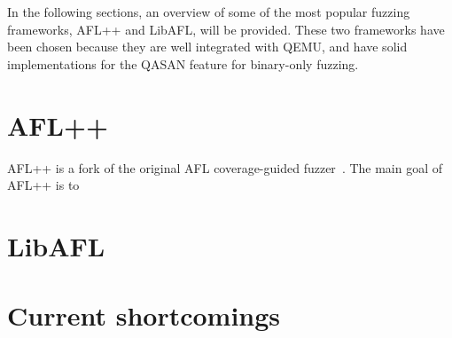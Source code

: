 In the following sections, an overview of some of the most popular fuzzing frameworks, AFL++ and LibAFL, will be provided.
These two frameworks have been chosen because they are well integrated with QEMU, and have solid implementations for the
\ac{QASAN} feature for binary-only fuzzing.


\section{AFL++}
AFL++ is a fork of the original \ac{AFL} coverage-guided fuzzer~\parencite{257204}. The main goal of AFL++ is to

\section{LibAFL}


\section{Current shortcomings}